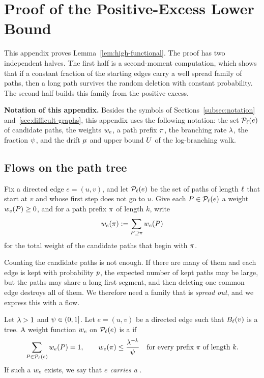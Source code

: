 \section{Proof of the Positive-Excess Lower Bound}\label{app:high-functional}

This appendix proves Lemma~\ref{lem:high-functional}. The proof has two
independent halves. The first half is a second-moment computation, which shows
that if a constant fraction of the starting edges carry a well spread family of
paths, then a long path survives the random deletion with constant
probability. The second half builds this family from the positive excess.

\medskip
\noindent\textbf{Notation of this appendix.} Besides the symbols of
Sections~\ref{subsec:notation} and~\ref{sec:difficult-graphs}, this appendix
uses the following notation: the set
\(\mathcal{P}_{\ell}(e)\) of candidate paths, the weights \(w_{e}\), a path prefix \(\pi\),
the branching rate \(\lambda\), the fraction \(\psi\), and the drift
\(\mu\) and upper bound \(U\) of the log-branching walk.

\subsection{Flows on the path tree}

Fix a directed edge \(e=(u,v)\), and let \(\mathcal{P}_{\ell}(e)\) be the set of paths of
length \(\ell\) that start at \(v\) and whose first step does not go to \(u\).
Give each \(P\in\mathcal{P}_{\ell}(e)\) a weight \(w_{e}(P)\ge0\), and for a path prefix
\(\pi\) of length \(k\), write
\[
  w_{e}(\pi):=\sum_{P\supseteq\pi}w_{e}(P)
\]
for the total weight of the candidate paths that begin with \(\pi\).

Counting the candidate paths is not enough. If there are many of them and each
edge is kept with probability \(p\), the expected number of kept paths may
be large, but the paths may share a long first segment, and then deleting one
common edge destroys all of them. We therefore need a family that is
\emph{spread out}, and we express this with a flow.

\begin{definition}[Flow]\label{def:flow}
Let \(\lambda>1\) and \(\psi\in(0,1]\). Let \(e=(u,v)\) be a directed edge such
that \(B_{\ell}(v)\) is a tree. A weight function \(w_{e}\) on \(\mathcal{P}_{\ell}(e)\)
is a \emph{\flowt{\brnum}{\gfrac}} if
\[
  \sum_{P\in\mathcal{P}_{\ell}(e)}w_{e}(P)=1,
  \qquad
  w_{e}(\pi)\le\frac{\lambda^{-k}}{\psi}
  \quad\text{for every prefix }\pi\text{ of length }k .
\]
If such a \(w_{e}\) exists, we say that \emph{\(e\) carries a
\flowt{\brnum}{\gfrac}}.
\end{definition}

